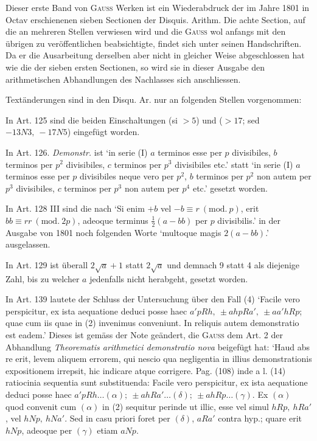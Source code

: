 Dieser erste Band von \textsc{Gauss} Werken ist ein Wiederabdruck der im Jahre 1801 in Octav erschienenen sieben Sectionen der Disquis. Arithm. Die achte Section, auf die an mehreren Stellen verwiesen wird und die \textsc{Gauss} wol anfangs mit den übrigen zu veröffentlichen beabsichtigte, findet sich unter seinen Handschriften. Da er die Ausarbeitung derselben aber nicht in gleicher Weise abgeschlossen hat wie die der sieben ersten Sectionen, so wird sie in dieser Ausgabe den arithmetischen Abhandlungen des Nachlasses sich anschliessen.

Textänderungen sind in den Disqu. Ar. nur an folgenden Stellen vorgenommen:

In Art. 125 sind die beiden Einschaltungen (si \(>5\)) und (\(>17\); sed \(-13N3,\allowbreak\ -17N5\)) eingefügt worden.

In Art. 126. \textit{Demonstr.} ist ‘in serie (I) \(a\) terminos esse per \(p\) divisibiles, \(b\) terminos per \(p^2\) divisibiles, \(c\) terminos per \(p^3\) divisibiles etc.’ statt ‘in serie (I) \(a\) terminos esse per \(p\) divisibiles neque vero per \(p^2\), \(b\) terminos per \(p^2\) non autem per \(p^3\) divisibiles, \(c\) terminos per \(p^3\) non autem per \(p^4\) etc.’ gesetzt worden.

In Art. 128 III sind die nach ‘Si enim \(+b\) vel \(-b\equiv r\ (\mathrm{mod.}\ p)\), erit \(bb\equiv rr\ (\mathrm{mod.}\ 2p)\), adeoque terminus \(\frac12(a-bb)\) per \(p\) divisibilis.’ in der Ausgabe von 1801 noch folgenden Worte ‘multoque magis \(2(a-bb)\).’ ausgelassen.

In Art. 129 ist überall \(2\surd a+1\) statt \(2\surd a\) und demnach 9 statt 4 als diejenige Zahl, bis zu welcher \(a\) jedenfalls nicht herabgeht, gesetzt worden.

In Art. 139 lautete der Schluss der Untersuchung über den Fall (4) ‘Facile vero perspicitur, ex ista aequatione deduci posse haec \(a'pRh,\allowbreak\ \pm ahpRa',\allowbreak\ \pm aa'hRp\); quae cum iis quae in (2) invenimus conveniunt. In reliquis autem demonstratio est eadem.’ Dieses ist gemäss der Note geändert, die \textsc{Gauss} dem Art. 2 der Abhandlung \textit{Theorematis arithmetici demonstratio nova} beigefügt hat: ‘Haud abs re erit, levem aliquem errorem, qui nescio qua negligentia in illius demonstrationis expositionem irrepsit, hic indicare atque corrigere. Pag. (108) inde a l. (14) ratiocinia sequentia sunt substituenda: Facile vero perspicitur, ex ista aequatione deduci posse haec \(a'pRh\ldots(\alpha);\allowbreak\ \pm ahRa'\ldots(\delta);\allowbreak\ \pm ahRp\ldots(\gamma)\). Ex \((\alpha)\) quod convenit cum \((\alpha)\) in (2) sequitur perinde ut illic, esse vel simul \(hRp,\allowbreak\ hRa'\), vel \(hNp,\allowbreak\ hNa'\). Sed in casu priori foret per \((\delta)\), \(aRa'\) contra hyp.; quare erit \(hNp\), adeoque per \((\gamma)\) etiam \(aNp\).


